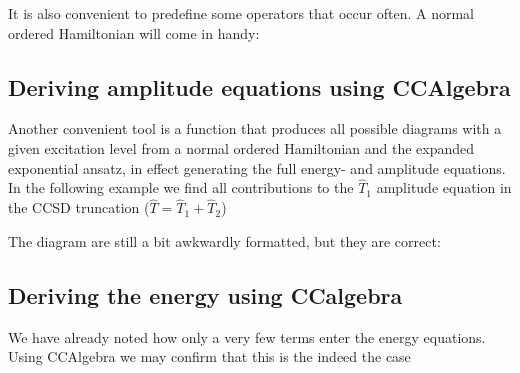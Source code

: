 \begin{minipage}{\linewidth}
\end{minipage}

It is also convenient to predefine some operators that occur often. A normal ordered Hamiltonian will come in handy:

\begin{minipage}{\linewidth}
\end{minipage}

\subsection{Deriving amplitude equations using CCAlgebra}

Another convenient tool is a function that produces all possible
diagrams with a given excitation level from a normal ordered
Hamiltonian and the expanded exponential ansatz, in effect generating
the full energy- and amplitude equations. In the following example we
find all contributions to the $\hat{T}_1$ amplitude equation in the CCSD
truncation ($\hat{T} = \hat{T}_1 + \hat{T}_2$)

\begin{minipage}{\linewidth}
\end{minipage}

The diagram are still a bit awkwardly formatted, but they are correct:

\begin{minipage}{\linewidth}
\end{minipage}

\subsection{Deriving the energy using CCalgebra}

We have already noted how only a very few terms enter the energy
equations. Using CCAlgebra we may confirm that this is the indeed the
case

\begin{minipage}{\linewidth}
\end{minipage}

